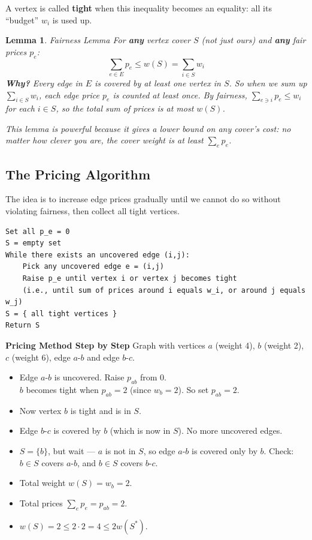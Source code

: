 \documentclass[12pt,a4paper]{report}
\newtheorem{lemma}{Lemma}
\begin{document}
A vertex is called \textbf{tight} when this inequality becomes an equality: all its ``budget'' $w_i$ is used up.

\begin{lemma}{Fairness Lemma}{}
For \textbf{any} vertex cover $S$ (not just ours) and \textbf{any} fair prices $p_e$:
\[
\sum_{e \in E} p_e \leq w(S) = \sum_{i \in S} w_i
\]
\textbf{Why?} Every edge in $E$ is covered by at least one vertex in $S$. So when we sum up $\sum_{i \in S} w_i$, each edge price $p_e$ is counted at least once. By fairness, $\sum_{e \ni i} p_e \leq w_i$ for each $i \in S$, so the total sum of prices is at most $w(S)$.

This lemma is powerful because it gives a lower bound on \textit{any} cover's cost: no matter how clever you are, the cover weight is at least $\sum_e p_e$.
\end{lemma}

\subsection{The Pricing Algorithm}

The idea is to increase edge prices gradually until we cannot do so without violating fairness, then collect all tight vertices.

\begin{verbatim}
Set all p_e = 0
S = empty set
While there exists an uncovered edge (i,j):
    Pick any uncovered edge e = (i,j)
    Raise p_e until vertex i or vertex j becomes tight
    (i.e., until sum of prices around i equals w_i, or around j equals w_j)
S = { all tight vertices }
Return S
\end{verbatim}

\textbf{Pricing Method Step by Step}{}
Graph with vertices $a$ (weight 4), $b$ (weight 2), $c$ (weight 6), edge $a$-$b$ and edge $b$-$c$.
\begin{itemize}
    \item Edge $a$-$b$ is uncovered. Raise $p_{ab}$ from 0.\\
    $b$ becomes tight when $p_{ab} = 2$ (since $w_b = 2$). So set $p_{ab} = 2$.
    \item Now vertex $b$ is tight and is in $S$.
    \item Edge $b$-$c$ is covered by $b$ (which is now in $S$). No more uncovered edges.
    \item $S = \{b\}$, but wait --- $a$ is not in $S$, so edge $a$-$b$ is covered only by $b$. Check: $b \in S$ covers $a$-$b$, and $b \in S$ covers $b$-$c$. \checkmark
    \item Total weight $w(S) = w_b = 2$.
    \item Total prices $\sum_e p_e = p_{ab} = 2$.
    \item $w(S) = 2 \leq 2 \cdot 2 = 4 \leq 2 w(S^*)$. \checkmark
\end{itemize}
\end{document}

